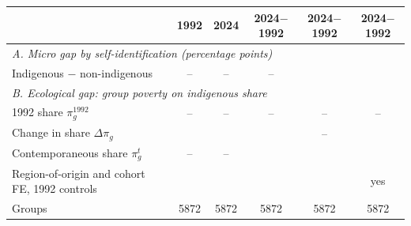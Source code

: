 \begin{tabular}{lccccc}
\toprule
 & 1992 & 2024 & 2024$-$1992 & 2024$-$1992 & 2024$-$1992 \\
\midrule
\multicolumn{6}{l}{\textit{A. Micro gap by self-identification (percentage points)}} \\
Indigenous $-$ non-indigenous & -- & -- & -- & & \\
\multicolumn{6}{l}{\textit{B. Ecological gap: group poverty on indigenous share}} \\
1992 share $\pi_g^{1992}$ & -- & -- & -- & -- & -- \\
Change in share $\Delta\pi_g$ & & & & -- & \\
Contemporaneous share $\pi_g^{t}$ & -- & -- & & & \\
Region-of-origin and cohort FE, 1992 controls & & & & & yes \\
Groups & 5872 & 5872 & 5872 & 5872 & 5872 \\
\bottomrule
\end{tabular}
